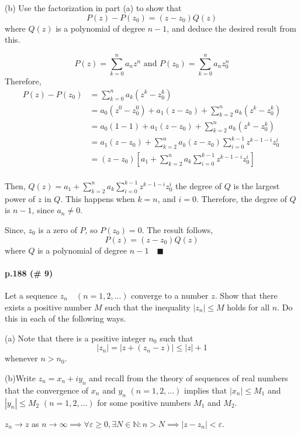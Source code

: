 \documentclass{article}
\newcommand\N{\mathbb{N}}
\begin{document}
(b) Use the factorization in part (a) to show that \[ P(z)-P(z_0) =
(z-z_0)Q(z)\]
where $Q(z)$ is a polynomial of degree $n − 1$, and deduce the desired result from
this.

\[P(z) = \sum_{k = 0}^n a_nz^n\text{ and } P(z_0) = \sum_{k = 0}^n
  a_nz_0^n\]
Therefore,
\begin{align*} P(z)-P(z_0) &= \sum_{k = 0}^n a_k(z^k - z_0^k)\\ &=
  a_0(z^0-z_0^0)+a_1(z-z_0) + \sum_{k =
    2}^n a_k(z^k-z_0^k)\\ &= a_0(1-1)+a_1(z-z_0)+\sum_{k =
    2}^n a_k(z^k-z_0^k)\\ &= a_1(z-z_0) + \sum_{k =
                            2}^n
                            a_k(z-z_0)\sum_{i=0}^{k-1}z^{k-1-i}z_0^i\\
  &= (z-z_0)[a_1+\sum_{k = 2}^n
                            a_k\sum_{i=0}^{k-1}z^{k-1-i}z_0^i]\\
\end{align*}

Then, $Q(z) = a_1+\sum_{k = 2}^n a_k\sum_{i=0}^{k-1}z^{k-1-i}z_0^i$ the
degree of $Q$ is the largest power of
$z$ in $Q$. This happens when $k = n$, and $i =
0$. Therefore, the degree of $Q$ is $n-1$,
since $a_n \neq 0$.

Since, $z_0$ is a zero of $P$, so $P(z_0) =
0$.  The result
follows, \[P(z) = (z-z_0)Q(z)\] where $Q$
is a polynomial of degree $n-1\quad
\blacksquare$

\paragraph{p.188 \color{blue}(\# 9)\color{black}}

Let a sequence $z_n\quad (n = 1, 2, . . .)$ converge to a number $z$. Show that there exists a
positive number $M$ such that the inequality $|z_n| ≤ M$ holds for all $n$. Do this in each
of the following ways.

(a) Note that there is a positive integer $n_0$ such that
\[|z_n| = |z+(z_n -z)|\leq |z|+1\]
whenever $n> n_0.$

(b)Write $z_n = x_n + iy_n$ and recall from the theory of sequences of real numbers that
the convergence of $x_n$ and $y_n$ $(n = 1, 2, \dots)$ implies that $|x_n| ≤ M_1$ and $|y_n| ≤ M_2
$ $(n = 1, 2, \dots)$ for some positive numbers $M_1$ and $M_2$.


$z_n\rightarrow z$ as $n\rightarrow \infty \implies \forall
\varepsilon \geq 0, \exists N\in \N: n> N \implies
|z-z_n| <\varepsilon$.
\end{document}
